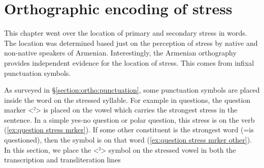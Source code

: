 \begin{table}[H]
	\centering
	\caption{Secondary stress on learned prefixes (adapted from Eastern from \citealt[29]{Soukyasyan-2004-ArmenianPhonology}) }
	\label{tab:secondaey stress learned prefixes}
\end{table}






\section{Orthographic encoding of stress}\label{section:stress:ortho}
This chapter went over the location of primary and secondary stress in words. The location was determined based just on the perception of stress by native and non-native speakers of Armenian. Interestingly, the Armenian orthography provides independent evidence for the location of stress. This comes from infixal punctuation symbols. 

As surveyed in \S\ref{section:ortho:punctuation}, some punctuation symbols are placed inside the word on the stressed syllable. For example in questions, the question marker  <ˀ> is placed on the vowel   which carries the strongest stress in the sentence. In a simple yes-no question or polar question, this stress is on the verb (\ref{ex:question stress mrker}). If some other constituent is the strongest word (=is questioned), then the symbol is on that word (\ref{ex:question stress mrker other}). In this section, we place the  <ˀ> symbol on the stressed vowel in both the transcription and transliteration lines 

